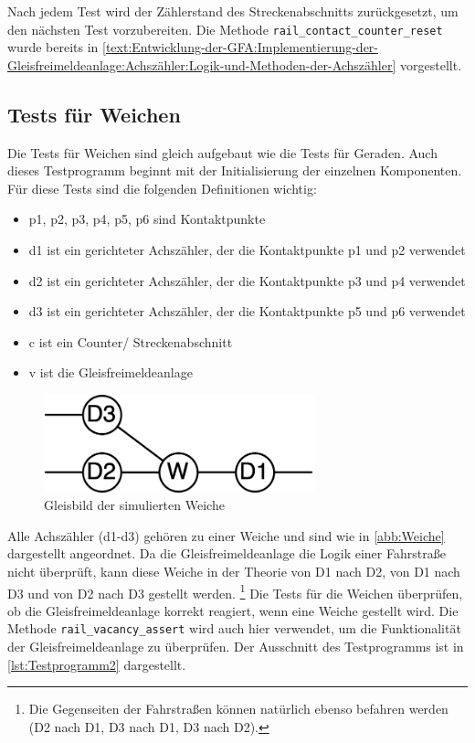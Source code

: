 Nach jedem Test wird der Zählerstand des Streckenabschnitts zurückgesetzt, um den nächsten Test vorzubereiten. Die Methode \texttt{rail\_contact\_counter\_reset} wurde bereits in \autoref{text:Entwicklung-der-GFA:Implementierung-der-Gleisfreimeldeanlage:Achszähler:Logik-und-Methoden-der-Achszähler}  vorgestellt.

\subsection{Tests für Weichen}\label{text:Entwicklung-der-GFA:Softwaretests:Tests-für-Weichen}

Die Tests für Weichen sind gleich aufgebaut wie die Tests für Geraden. Auch dieses Testprogramm beginnt mit der Initialisierung der einzelnen Komponenten. Für diese Tests sind die folgenden Definitionen wichtig:
\begin{itemize}
    \item p1, p2, p3, p4, p5, p6 sind Kontaktpunkte
    \item d1 ist ein gerichteter Achszähler, der die Kontaktpunkte p1 und p2 verwendet
    \item d2 ist ein gerichteter Achszähler, der die Kontaktpunkte p3 und p4 verwendet
    \item d3 ist ein gerichteter Achszähler, der die Kontaktpunkte p5 und p6 verwendet
    \item c ist ein Counter/ Streckenabschnitt
    \item v ist die Gleisfreimeldeanlage
\end{itemize}

\begin{figure}[H]
    \centering
    \includegraphics[width=0.7\textwidth]{Assets/Images/4-Entwicklung-der-GFA/Weiche.png}
    \caption{Gleisbild der simulierten Weiche}
    \label{abb:Weiche}
\end{figure}

Alle Achszähler (d1-d3) gehören zu einer Weiche und sind wie in \autoref{abb:Weiche} dargestellt angeordnet. Da die Gleisfreimeldeanlage die Logik einer Fahrstraße nicht überprüft, kann diese Weiche in der Theorie von D1 nach D2, von D1 nach D3 und von D2 nach D3 gestellt werden. \footnote{Die Gegenseiten der Fahrstraßen können natürlich ebenso befahren werden (D2 nach D1, D3 nach D1, D3 nach D2).} Die Tests für die Weichen überprüfen, ob die Gleisfreimeldeanlage korrekt reagiert, wenn eine Weiche gestellt wird. Die Methode \texttt{rail\_vacancy\_assert} wird auch hier verwendet, um die Funktionalität der Gleisfreimeldeanlage zu überprüfen. Der Ausschnitt des Testprogramms ist in \autoref{lst:Testprogramm2} dargestellt.

